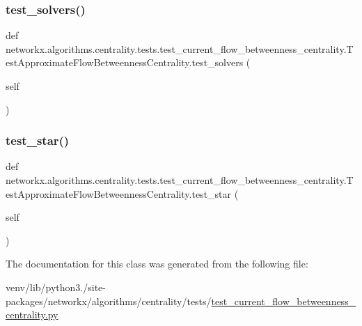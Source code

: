\subsubsection{\texorpdfstring{test\+\_\+solvers()}{test\_solvers()}}
{\footnotesize\ttfamily def networkx.\+algorithms.\+centrality.\+tests.\+test\+\_\+current\+\_\+flow\+\_\+betweenness\+\_\+centrality.\+Test\+Approximate\+Flow\+Betweenness\+Centrality.\+test\+\_\+solvers (\begin{DoxyParamCaption}\item[{}]{self }\end{DoxyParamCaption})}

\mbox{\label{classnetworkx_1_1algorithms_1_1centrality_1_1tests_1_1test__current__flow__betweenness__centrali5aba835aefc4fe33e0352f52dae5ae14_a2fd4123e574d1e03bf787b543a873276}} 
\subsubsection{\texorpdfstring{test\+\_\+star()}{test\_star()}}
{\footnotesize\ttfamily def networkx.\+algorithms.\+centrality.\+tests.\+test\+\_\+current\+\_\+flow\+\_\+betweenness\+\_\+centrality.\+Test\+Approximate\+Flow\+Betweenness\+Centrality.\+test\+\_\+star (\begin{DoxyParamCaption}\item[{}]{self }\end{DoxyParamCaption})}



The documentation for this class was generated from the following file\+:\begin{DoxyCompactItemize}
\item 
venv/lib/python3./site-\/packages/networkx/algorithms/centrality/tests/\hyperlink{test__current__flow__betweenness__centrality_8py}{test\+\_\+current\+\_\+flow\+\_\+betweenness\+\_\+centrality.\+py}\end{DoxyCompactItemize}
